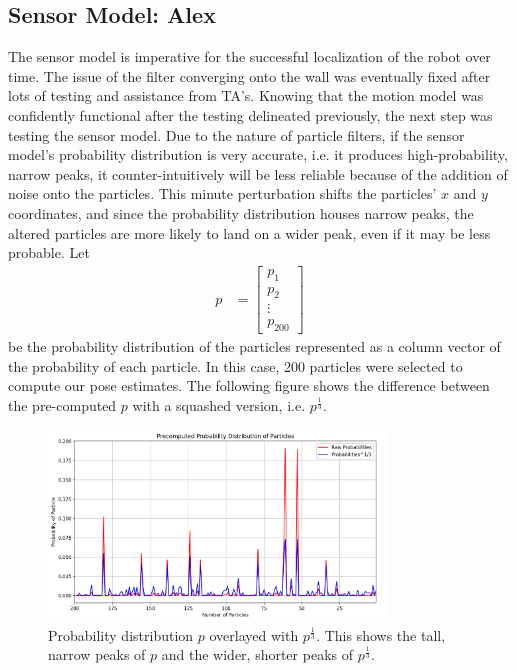 \documentclass{article}
\begin{document}
\subsection{Sensor Model: Alex}
The sensor model is imperative for the successful localization of the robot over time. The issue of the filter converging onto the wall was eventually fixed after lots of testing and assistance from TA's. Knowing that the motion model was confidently functional after the testing delineated previously, the next step was testing the sensor model. Due to the nature of particle filters, if the sensor model's probability distribution is very accurate, i.e. it produces high-probability, narrow peaks, it counter-intuitively will be less reliable because of the addition of noise onto the particles. This minute perturbation shifts the particles' $x$ and $y$ coordinates, and since the probability distribution houses narrow peaks, the altered particles are more likely to land on a wider peak, even if it may be less probable. Let 
\begin{align*}
    p &= \begin{bmatrix}
           p_{1} \\
           p_{2} \\
           \vdots \\
           p_{200}
         \end{bmatrix}
\end{align*}
be the probability distribution of the particles represented as a column vector of the probability of each particle. In this case, 200 particles were selected to compute our pose estimates.
The following figure shows the difference between the pre-computed $p$ with a squashed version, i.e. $p^{\frac{1}{3}}$.

\begin{figure}[H]
    \centering
    \includegraphics[width=0.8\textwidth]{prob.png} %
    \caption{Probability distribution $p$ overlayed with $p^{\frac{1}{3}}$. This shows the tall, narrow peaks of $p$ and the wider, shorter peaks of $p^{\frac{1}{3}}$.}
    \label{fig:probabilities}
\end{figure}
\end{document}
